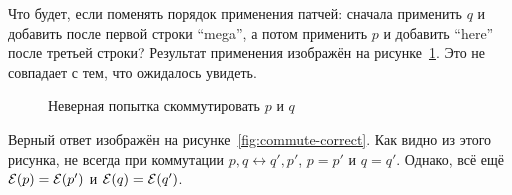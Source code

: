 Что будет, если поменять порядок применения патчей: сначала применить
$q$ и добавить после первой строки ``mega'', а потом применить $p$ и
добавить ``here'' после третьей строки? Результат применения изображён
на рисунке~\ref{fig:commute-wrong}. Это не совпадает с тем, что
ожидалось увидеть.

\begin{figure}
  \centering
  \caption{Неверная попытка скоммутировать $p$ и $q$}
  \label{fig:commute-wrong}
\end{figure}

Верный ответ изображён на рисунке~\ref{fig:commute-correct}. Как видно
из этого рисунка, не всегда при коммутации $p, q \longleftrightarrow
q', p'$, $p = p'$ и $q = q'$. Однако, всё ещё ${\cal E}(p) = {\cal
  E}(p')$ и ${\cal E}(q) = {\cal E}(q')$.

